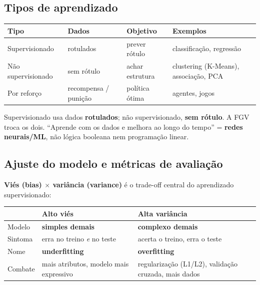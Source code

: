 \subsection{Tipos de aprendizado}

\begin{center}
\begin{tabular}{@{}p{2.6cm}p{2.6cm}p{2.4cm}p{2.7cm}@{}}
\toprule
\textbf{Tipo} & \textbf{Dados} & \textbf{Objetivo} & \textbf{Exemplos} \\
\midrule
Supervisionado & rotulados & prever rótulo & classificação, regressão \\
Não supervisionado & sem rótulo & achar estrutura & clustering (K-Means), associação, PCA \\
Por reforço & recompensa / punição & política ótima & agentes, jogos \\
\bottomrule
\end{tabular}
\end{center}

\begin{pegadinha}
Supervisionado usa dados \textbf{rotulados}; não supervisionado, \textbf{sem
rótulo}. A FGV troca os dois. ``Aprende com os dados e melhora ao longo do
tempo'' = \textbf{redes neurais/ML}, não lógica booleana nem programação
linear.
\end{pegadinha}

\subsection{Ajuste do modelo e métricas de avaliação}

\textbf{Viés (bias) $\times$ variância (variance)} é o trade-off central do
aprendizado supervisionado:

\begin{center}
\begin{tabular}{@{}p{2.6cm}p{4.4cm}p{4.4cm}@{}}
\toprule
& \textbf{Alto viés} & \textbf{Alta variância} \\
\midrule
Modelo & \textbf{simples demais} & \textbf{complexo demais} \\
Sintoma & erra no treino \emph{e} no teste & acerta o treino, erra o teste \\
Nome & \textbf{underfitting} & \textbf{overfitting} \\
Combate & mais atributos, modelo mais expressivo & regularização (L1/L2),
validação cruzada, mais dados \\
\bottomrule
\end{tabular}
\end{center}

